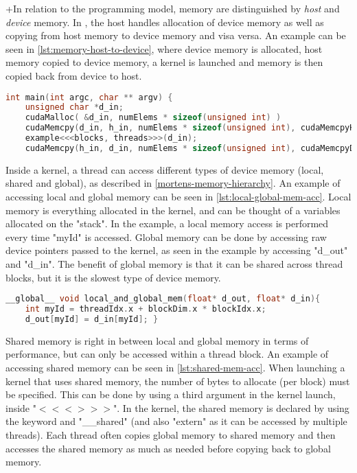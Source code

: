 +In relation to the \cuda{} programming model, memory are distinguished by \textit{host} and \textit{device} memory.
In \cuda{}, the host handles allocation of device memory as well as copying from host memory to device memory and visa versa.
An example can be seen in \autoref{lst:memory-host-to-device}, where device memory is allocated, host memory copied to device memory, a kernel is launched and memory is then copied back from device to host.
\begin{lstlisting}[language=C++,caption={Example of allocation and copying from host to device},label=lst:memory-host-to-device]
int main(int argc, char ** argv) {
	unsigned char *d_in;
	cudaMalloc( &d_in, numElems * sizeof(unsigned int) )
	cudaMemcpy(d_in, h_in, numElems * sizeof(unsigned int), cudaMemcpyHostToDevice)
	example<<<blocks, threads>>>(d_in);
	cudaMemcpy(h_in, d_in, numElems * sizeof(unsigned int), cudaMemcpyDeviceToHost) }
\end{lstlisting}
Inside a kernel, a thread can access different types of device memory (local, shared and global), as described in \autoref{mortens-memory-hierarchy}.
An example of accessing local and global memory can be seen in \autoref{lst:local-global-mem-acc}.
Local memory is everything allocated in the kernel, and can be thought of a variables allocated on the "stack". In the example, a local memory access is performed every time "myId" is accessed.
Global memory can be done by accessing raw device pointers passed to the kernel, as seen in the example by accessing "d\_out" and "d\_in".
The benefit of global memory is that it can be shared across thread blocks, but it is the slowest type of device memory.
\begin{lstlisting}[language=C,caption={Local and global memory access},label=lst:local-global-mem-acc]
__global__ void local_and_global_mem(float* d_out, float* d_in){
	int myId = threadIdx.x + blockDim.x * blockIdx.x;
	d_out[myId] = d_in[myId]; }
\end{lstlisting}
Shared memory is right in between local and global memory in terms of performance, but can only be accessed within a thread block.
An example of accessing shared memory can be seen in \autoref{lst:shared-mem-acc}.
When launching a kernel that uses shared memory, the number of bytes to allocate (per block) must be specified.
This can be done by using a third argument in the kernel launch, inside "$<<< >>>$".
In the kernel, the shared memory is declared by using the keyword and "\_\_shared" (and also "extern" as it can be accessed by multiple threads).
Each thread often copies global memory to shared memory and then accesses the shared memory as much as needed before copying back to global memory.
